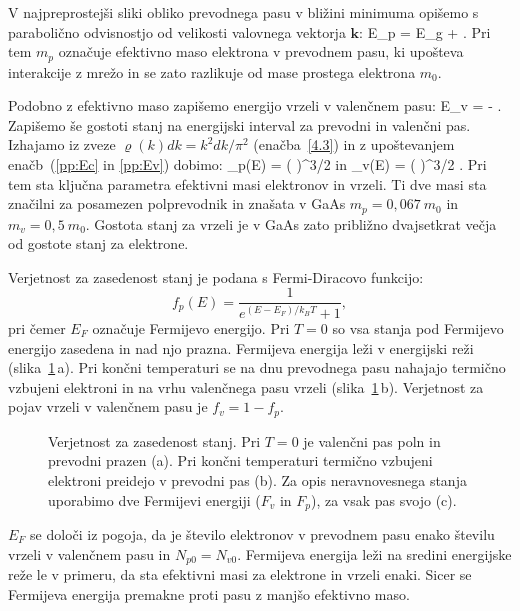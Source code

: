 V najpreprostejši sliki obliko prevodnega pasu v bližini minimuma opišemo 
s parabolično odvisnostjo od velikosti valovnega vektorja $\mathbf{k}$:
\beq
E_p = E_g + .
\label{pp:Ec}
\eeq
Pri tem $m_p$ označuje efektivno maso elektrona v prevodnem pasu, ki upošteva
interakcije z mrežo in se zato razlikuje od mase prostega elektrona $m_0$.

Podobno z efektivno maso zapišemo energijo vrzeli v valenčnem pasu:
\beq
E_v = - .
\label{pp:Ev}
\eeq
Zapišemo še gostoti stanj na energijski interval za prevodni in valenčni pas. Izhajamo iz zveze
$\varrho(k) dk = k^2dk /\pi^2$ (enačba~\ref{4.3}) in z upoštevanjem 
enačb~(\ref{pp:Ec} in \ref{pp:Ev}) dobimo:
\beq
\varrho_p(E) = \left( \right)^{3/2} 
\label{eq:rho_v}
\eeq
in
\beq
\varrho_v(E) = \left( \right)^{3/2} .
\label{eq:rho_p}
\eeq
Pri tem sta ključna parametra efektivni masi 
elektronov in vrzeli. Ti dve masi sta značilni za posamezen polprevodnik
in znašata v GaAs $m_p = 0,067~m_0$ in $m_v = 0,5~m_0$. 
Gostota stanj za vrzeli je v GaAs zato približno 
dvajsetkrat večja od gostote stanj za elektrone.

Verjetnost za zasedenost stanj je podana s Fermi-Diracovo funkcijo: 
\begin{equation}  
f_p(E)=\frac{1}{e^{(E-E_F)/k_B T}+1},
\label{eq:7FD}
\end{equation}
pri čemer $E_F$ označuje Fermijevo energijo. Pri $T=0$ so vsa stanja pod 
Fermijevo energijo zasedena in nad njo prazna. Fermijeva energija leži
v energijski reži (slika~\ref{fig:Fermi}\,a). Pri končni temperaturi se na dnu prevodnega pasu nahajajo 
termično vzbujeni elektroni in na vrhu valenčnega pasu vrzeli (slika~\ref{fig:Fermi}\,b). Verjetnost 
za pojav vrzeli v valenčnem pasu je $f_v = 1 - f_p$.

\begin{figure}[ht]
\centering
\def\svgwidth{128truemm} 

\caption{Verjetnost za zasedenost stanj. Pri $T=0$ je valenčni pas poln in prevodni prazen (a).
Pri končni temperaturi termično vzbujeni elektroni preidejo v prevodni pas (b). Za opis neravnovesnega
stanja uporabimo dve Fermijevi energiji ($F_v$ in $F_p$), za vsak pas svojo (c).
}
\label{fig:Fermi}
\end{figure}

\begin{remark}
$E_F$ se določi iz pogoja, da je število elektronov v prevodnem pasu enako 
številu vrzeli v valenčnem pasu in $N_{p0} = N_{v0}$. Fermijeva energija
leži na sredini energijske reže le v primeru, da sta efektivni masi 
za elektrone in vrzeli enaki. Sicer se Fermijeva energija premakne
proti pasu z manjšo efektivno maso. 
\end{remark}

